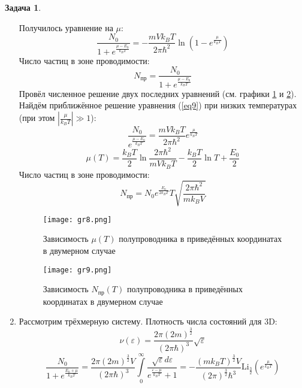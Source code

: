 \documentclass[12pt]{article}
\theoremstyle{definition}
\newtheorem{zad}{Задача}[section]
\begin{document}
\begin{zad}
\begin{enumerate}
\begin{equation}
    \end{equation}
    Получилось уравнение на $\mu$:
    \begin{equation}\label{eq9}
        \boxed{\frac{N_0}{1+e^{\frac{\mu-E_0}{k_BT}}}=-\frac{mVk_BT}{2\pi\hbar^2}\ln\left(1-e^\frac{\mu}{k_BT}\right)}
    \end{equation}
    Число частиц в зоне проводимости:
    \begin{equation}
        N_\text{пр}=\frac{N_0}{1+e^{\frac{\mu-E_0}{k_BT}}}
    \end{equation}
    Провёл численное решение двух последних уравнений (см. графики \ref{gr8} и \ref{gr9}).\\
    Найдём приближённое решение уравнения (\ref{eq9}) при низких температурах (при этом $|\frac{\mu}{k_BT}|\gg1$):
    \begin{equation}
        \frac{N_0}{e^{\frac{\mu-E_0}{k_BT}}}=\frac{mVk_BT}{2\pi\hbar^2}e^\frac{\mu}{k_BT}
    \end{equation}
    \begin{equation}
        \boxed{\mu(T)=\frac{k_BT}{2}\ln\frac{2\pi\hbar^2}{mVk_BT}-\frac{k_BT}{2}\ln T+\frac{E_0}{2}}
    \end{equation}
    Число частиц в зоне проводимости:
    \begin{equation}
        \boxed{N_\text{пр}=N_0e^{\frac{E_0}{2k_BT}}T\sqrt{\frac{2\pi\hbar^2}{mk_BV}}}
    \end{equation}
    \begin{figure}
        \centering
        \texttt{[image: gr8.png]}
        \caption{Зависимость $\mu(T)$ полупроводника в приведённых координатах в двумерном случае}
        \label{gr8}
    \end{figure}
    \begin{figure}
        \centering
        \texttt{[image: gr9.png]}
        \caption{Зависимость $N_\text{пр}(T)$ полупроводника в приведённых координатах в двумерном случае}
        \label{gr9}
    \end{figure}
    \item  Рассмотрим трёхмерную систему. Плотность числа состояний для 3D:
    \begin{equation}
        \nu(\varepsilon)=\frac{2\pi(2m)^\frac{3}{2}}{(2\pi\hbar)^3}\sqrt{\varepsilon}
    \end{equation}
    \begin{equation}
        \frac{N_0}{1+e^{\frac{E_0+\mu}{k_BT}}}=\frac{2\pi(2m)^\frac{3}{2}V}{(2\pi\hbar)^3}\int\limits_0^\infty\frac{\sqrt{\varepsilon}d\varepsilon}{e^{\frac{\varepsilon-\mu}{k_BT}}+1}=-\frac{(mk_BT)^\frac{3}{2}V}{(2\pi)^\frac{3}{2}\hbar^3}\text{Li}_\frac{3}{2}\left(e^\frac{\mu}{k_BT}\right)

\end{equation}
\end{enumerate}
\end{zad}
\end{document}
